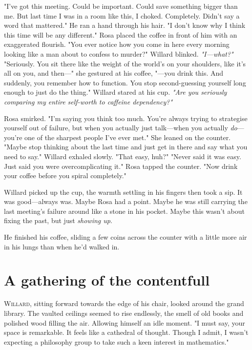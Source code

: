 \smallskip
"I’ve got this meeting. Could be important. Could save something bigger than me. But last time I was in a room like this, I choked. Completely. Didn’t say a word that mattered." He ran a hand through his hair. "I don’t know why I think this time will be any different."
\smallskip
Rosa placed the coffee in front of him with an exaggerated flourish. "You ever notice how you come in here every morning looking like a man about to confess to murder?"
\smallskip
Willard blinked. \textit{"I—what?"}
\smallskip
"Seriously. You sit there like the weight of the world’s on your shoulders, like it’s all on you, and then—"  she gestured at his coffee, "—you drink this. And suddenly, you remember how to function. You stop second-guessing yourself long enough to just do the thing."
\smallskip
Willard stared at his cup. \textit{"Are you seriously comparing my entire self-worth to caffeine dependency?"}
\smallskip

Rosa smirked. "I’m saying you think too much. You’re always trying to strategise yourself out of failure, but when you actually just talk—when you actually \textit{do}—you’re one of the sharpest people I’ve ever met." She leaned on the counter. "Maybe stop thinking about the last time and just get in there and say what you need to say."
\smallskip
Willard exhaled slowly. "That easy, huh?"
\smallskip
"Never said it was easy. Just said you were overcomplicating it." Rosa tapped the counter. "Now drink your coffee before you spiral completely."
\smallskip

Willard picked up the cup, the warmth settling in his fingers then took a sip. It was good—always was. Maybe Rosa had a point. Maybe he was still carrying the last meeting’s failure around like a stone in his pocket. Maybe this wasn’t about fixing the past, but just \textit{showing up}.

He finished his coffee, sliding a few coins across the counter with a little more air in his lungs than when he’d walked in.
\newpage
\section*{A gathering of the contentfull}

\lettrine{W}{illard}, sitting forward towards the edge of his chair, looked around the grand library. The vaulted ceilings seemed to rise endlessly, the smell of old books and polished wood filling the air. Allowing himself an idle moment. "I must say, your space is remarkable. It feels like a cathedral of thought. Though I admit, I wasn’t expecting a philosophy group to take such a keen interest in mathematics."

